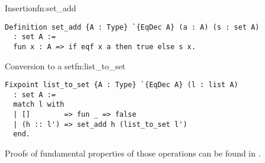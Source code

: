 \begin{func}{Insertion}{fn:set_add}
\begin{verbatim}
Definition set_add {A : Type} `{EqDec A} (a : A) (s : set A)  
  : set A :=
  fun x : A => if eqf x a then true else s x.
\end{verbatim}
\end{func}
\begin{func}{Conversion to a set}{fn:list_to_set}
\begin{verbatim}
Fixpoint list_to_set {A : Type} `{EqDec A} (l : list A) 
  : set A :=
  match l with
  | []        => fun _ => false
  | (h :: l') => set_add h (list_to_set l')
  end.
\end{verbatim}
\end{func}
Proofs of fundamental properties of those operations can be found in .